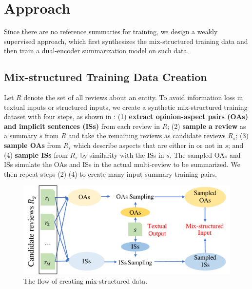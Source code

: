 \section{Approach}
\label{sec:approach}
Since there are no reference summaries for training,
we design a weakly supervised approach, 
which first synthesizes the mix-structured training data and 
then train a dual-encoder summarization model on such data.

\subsection{Mix-structured Training Data Creation}
\label{sec:data}
Let $R$ denote the set of all reviews about an entity.
To avoid information loss in textual inputs or structured inputs,
we create a synthetic mix-structured training dataset %
with four steps, 
as shown in :
(1) \textbf{extract opinion-aspect pairs (OAs) and implicit sentences (ISs)} from 
each review in $R$;
(2) \textbf{sample a review} as a summary $s$ from $R$ and 
take the remaining reviews as candidate reviews $R_s$; 
(3) {\bf sample OAs} from $R_s$ which describe aspects that
are either in or not in $s$;
and (4) {\bf sample ISs} from $R_s$ 
by similarity with the ISs in $s$. 
The sampled OAs and ISs simulate the OAs and ISs in the actual multi-review to be 
summarized. We then repeat steps (2)-(4) to create many input-summary training pairs.

\begin{figure}[th]
	\centering
	\includegraphics[width=1.0\linewidth]{./dm.pdf}
	\caption{The flow of creating mix-structured data.} %
	\label{fig:dm}
\end{figure}


